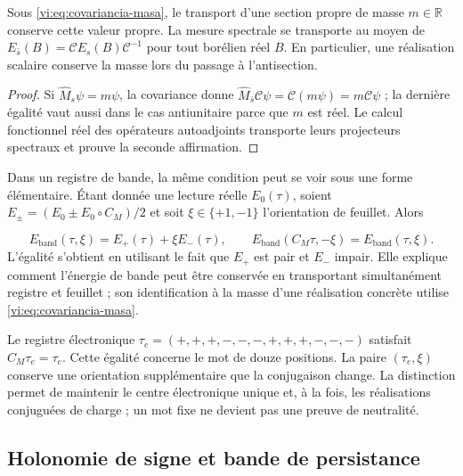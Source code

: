 \begin{proposition}
\label{vi:prop:masa-conjugada}
Sous \eqref{vi:eq:covariancia-masa}, le transport d’une section
propre de masse $m\in\mathbb R$ conserve cette valeur propre. La mesure
spectrale se transporte au moyen de
$E_{\bar s}(B)=\mathcal C E_s(B)\mathcal C^{-1}$ pour tout
borélien réel $B$. En particulier, une réalisation scalaire conserve
la masse lors du passage à l’antisection.

\end{proposition}
\begin{proof}
Si $\widehat M_s\psi=m\psi$, la covariance donne
$\widehat M_{\bar s}\mathcal C\psi
=\mathcal C(m\psi)=m\mathcal C\psi$ ; la dernière égalité
vaut aussi dans le cas antiunitaire parce que $m$ est réel. Le calcul
fonctionnel réel des opérateurs autoadjoints transporte leurs
projecteurs spectraux et prouve la seconde affirmation.

\end{proof}

Dans un registre de bande, la même condition peut se voir sous une forme
élémentaire. Étant donnée une lecture réelle $E_0(\tau)$, soient
$E_\pm=(E_0\pm E_0\circ C_M)/2$ et soit $\xi\in\{+1,-1\}$
l’orientation de feuillet. Alors

\begin{equation}
 E_{\mathrm{band}}(\tau,\xi)=E_+(\tau)+\xi E_-(\tau),\qquad
 E_{\mathrm{band}}(C_M\tau,-\xi)=E_{\mathrm{band}}(\tau,\xi).
 \label{vi:eq:banda-paridad}
\end{equation}
L’égalité s’obtient en utilisant le fait que $E_+$ est pair et $E_-$ impair.
Elle explique comment l’énergie de bande peut être conservée en transportant
simultanément registre et feuillet ; son identification à la masse d’une
réalisation concrète utilise \eqref{vi:eq:covariancia-masa}.


Le registre électronique
$\tau_e=(+,+,+,-,-,-,+,+,+,-,-,-)$ satisfait $C_M\tau_e=\tau_e$.
Cette égalité concerne le mot de douze positions. La paire
$(\tau_e,\xi)$ conserve une orientation supplémentaire que la
conjugaison change. La distinction permet de maintenir le centre
électronique unique et, à la fois, les réalisations conjuguées de charge ;
un mot fixe ne devient pas une preuve de neutralité.


\subsection{Holonomie de signe et bande de persistance
}
\label{vi:subsec:mobius}

